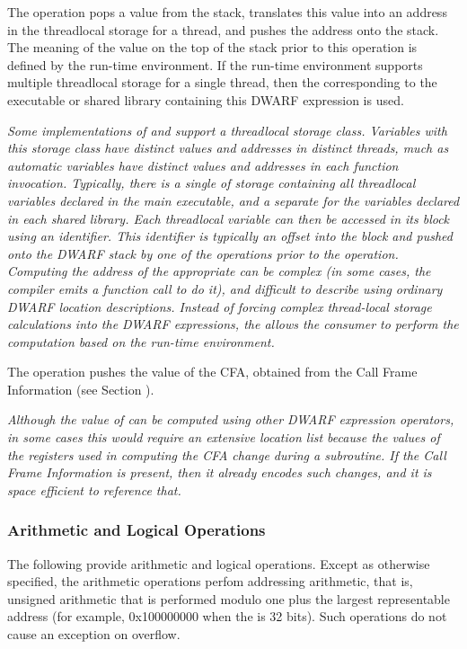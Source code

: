 \begin{enumerate}[1. ]
\itembfnl{\DWOPformtlsaddressTARG}
The \DWOPformtlsaddressTARG{} 
operation pops a value from the stack, translates this
value into an address in the 
thread\dash local storage for a thread, and pushes the address 
onto the stack. 
The meaning of the value on the top of the stack prior to this 
operation is defined by the run-time environment.  If the run-time 
environment supports multiple thread\dash local storage 
 for a single thread, then the  
corresponding to the executable or shared 
library containing this DWARF expression is used.
   
\textit{Some implementations of 
 and  support a
thread\dash local storage class. Variables with this storage class
have distinct values and addresses in distinct threads, much
as automatic variables have distinct values and addresses in
each function invocation. Typically, there is a single 
of storage containing all thread\dash local variables declared in
the main executable, and a separate  for the variables
declared in each shared library. 
Each thread\dash local variable can then be accessed in its block using an
identifier. This identifier is typically an offset into the block and pushed
onto the DWARF stack by one of the 
\DWOPconstnx{} operations prior to the
\DWOPformtlsaddress{} operation. 
Computing the address of
the appropriate  can be complex (in some cases, the
compiler emits a function call to do it), and difficult
to describe using ordinary DWARF location descriptions.
Instead of    forcing complex thread-local storage calculations into 
the DWARF expressions, the \DWOPformtlsaddress{} allows the consumer 
to perform the computation based on the run-time environment.}

\itembfnl{\DWOPcallframecfaTARG}
The \DWOPcallframecfaTARG{} 
operation pushes the value of the
CFA, obtained from the Call Frame Information 
(see Section ).

\textit{Although the value of \DWATframebase{}
can be computed using other DWARF expression operators,
in some cases this would require an extensive location list
because the values of the registers used in computing the
CFA change during a subroutine. If the 
Call Frame Information 
is present, then it already encodes such changes, and it is
space efficient to reference that.}
\end{enumerate}

\subsubsection{Arithmetic and Logical Operations}
The 
following 
provide arithmetic and logical operations. Except
as otherwise specified, the arithmetic operations perfom
addressing arithmetic, that is, unsigned arithmetic that is
performed modulo one plus the largest representable address
(for example, 0x100000000 when the 
 is 32 bits). 
Such operations do not cause an exception on overflow.

